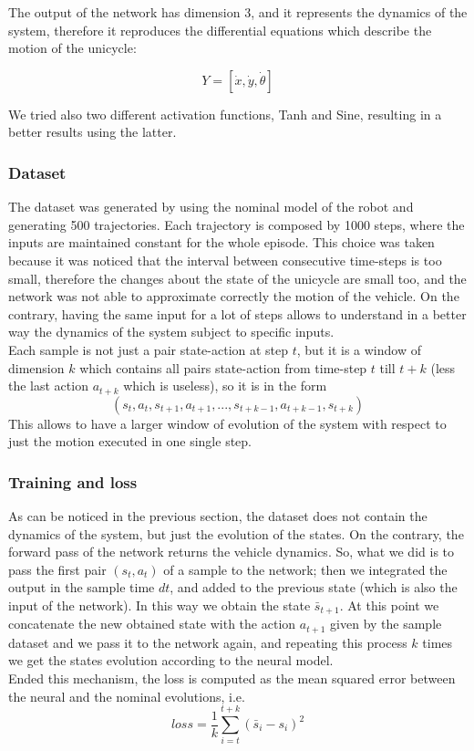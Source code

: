 The output of the network has dimension 3, and it represents the dynamics of the system, therefore it reproduces 
the differential equations which describe the motion of the unicycle:

\begin{equation}
    Y = [\dot{x}, \dot{y}, \dot{\theta}]
\end{equation}

We tried also two different activation functions, Tanh and Sine, resulting in a better results using the latter.

\subsubsection{Dataset}
The dataset was generated by using the nominal model of the robot and generating 500 trajectories.
Each trajectory is composed by 1000 steps, where the inputs are maintained constant for the whole episode.
This choice was taken because it was noticed that the interval between
consecutive time-steps is too small, therefore the changes about the state of the unicycle are small too, and 
the network was not able to approximate correctly the motion of the vehicle. On the contrary, having the same
input for a lot of steps allows to understand in a better way the dynamics of the system subject to specific 
inputs. \\
Each sample is not just a pair state-action at step $t$, but it is a window of dimension $k$ which contains
all pairs state-action from time-step $t$ till $t+k$ (less the last action $a_{t+k}$ which is useless), 
so it is in the form 
\begin{equation}
    (s_t, a_t, s_{t+1}, a_{t+1}, ..., s_{t+k-1}, a_{t+k-1}, s_{t+k})
\end{equation}
This allows to have a larger window of evolution of the system with respect to just the motion executed in
one single step. 


\subsubsection{Training and loss}

As can be noticed in the previous section, the dataset does not contain the dynamics of the system, 
but just the evolution of the states. On the contrary, the forward pass of the network returns
the vehicle dynamics. So, what we did is to pass the first pair $(s_t, a_t)$ of a sample to the 
network; then we integrated the output in the sample time $dt$, 
and added to the previous state (which is also the input of the network).
In this way we obtain the state $\bar{s}_{t+1}$.
At this point we concatenate the new obtained state with the action $a_{t+1}$ given by the sample dataset
and we pass it to the network again, and repeating
this process $k$ times we get the states evolution according to the neural model. \\
Ended this mechanism, the loss is computed as the mean squared error between the neural and the nominal evolutions, i.e.
\begin{equation}
    loss = \frac{1}{k}\sum_{i=t}^{t+k} (\bar{s}_i - s_i)^2
\end{equation}


